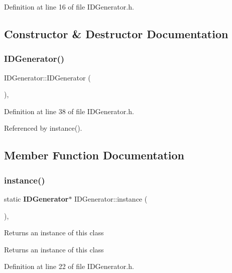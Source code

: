 Definition at line 16 of file I\+D\+Generator.\+h.



\subsection{Constructor \& Destructor Documentation}
\mbox{\label{class_i_d_generator_a8209b55f50b469c47f977660a769b1da}} 
\subsubsection{IDGenerator()}
{\footnotesize\ttfamily I\+D\+Generator\+::\+I\+D\+Generator (\begin{DoxyParamCaption}{ }\end{DoxyParamCaption})\hspace{0.3cm}{\ttfamily [inline]}, {\ttfamily [private]}}



Definition at line 38 of file I\+D\+Generator.\+h.



Referenced by instance().



\subsection{Member Function Documentation}
\mbox{\label{class_i_d_generator_ad852c6dadc89e1020e4b3932f5a97bb3}} 
\subsubsection{instance()}
{\footnotesize\ttfamily static \textbf{ I\+D\+Generator}$\ast$ I\+D\+Generator\+::instance (\begin{DoxyParamCaption}{ }\end{DoxyParamCaption})\hspace{0.3cm}{\ttfamily [inline]}, {\ttfamily [static]}}

Returns an instance of this class \begin{DoxyReturn}{Returns}
an instance of this class 
\end{DoxyReturn}


Definition at line 22 of file I\+D\+Generator.\+h.



